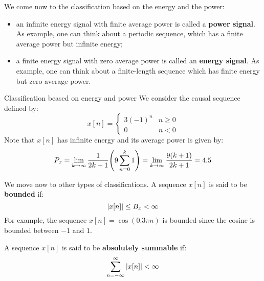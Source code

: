 \documentclass[../../main/main.tex]{subfiles}
\begin{document}
We come now to the classification based on the energy and the power:
\begin{itemize}
    \item an infinite energy signal with finite average power is called a \textbf{power signal}. As example, one can think about a periodic sequence, which has a finite average power but infinite energy;
    \item a finite energy signal with zero average power is called an \textbf{energy signal}. As example, one can think about a finite-length sequence which has finite energy but zero average power.
\end{itemize}

\begin{example}{Classification beased on energy and power}{}
    We consider the causal sequence defined by:
    \begin{equation}
        x[n]
        =
        \begin{cases}
            3(-1)^{n}   &   n \ge 0 \\
            0           &   n < 0
        \end{cases}
        \label{eq:L02_S50_1}
    \end{equation}
    Note that \( x[n] \) has infinite energy and its average power is given by:
    \begin{equation}
        P_{x}
        =
        \lim_{k \to \infty} \frac{1}{2k+1} \qty(9 \sum_{n=0}^{k} 1)
        =
        \lim_{k \to \infty} \frac{9(k+1)}{2k+1}
        =
        4.5
        \label{eq:L02_S50_2}
    \end{equation}
\end{example}


\medskip
{}
We move now to other types of classifications. A sequence \( x[n] \) is said to be \textbf{bounded} if:
\begin{equation}
    \abs{x[n]}
    \le
    B_{x}
    <
    \infty
    \label{eq:L02_S51_1}
\end{equation}
For example, the sequence \( x[n] = \cos(0.3\pi n) \) is bounded since the cosine is bounded between \( -1 \) and \( 1 \).

A sequence \( x[n] \) is said to be \textbf{absolutely summable} if:
\begin{equation}
    \sum_{n=-\infty}^{\infty} \abs{x[n]}
    <
    \infty
    \label{eq:L02_S52_1}
\end{equation}
\end{document}
